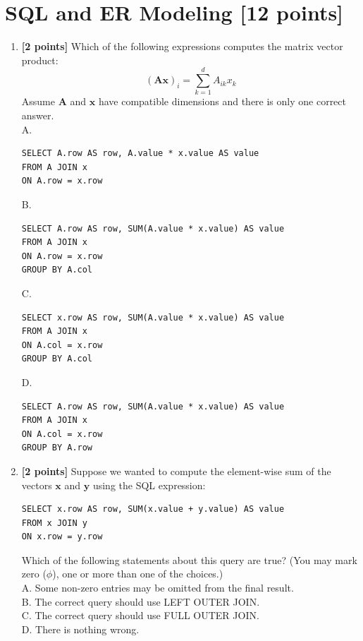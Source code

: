 \documentclass[10pt]{article}
\begin{document}
\newpage
\section{SQL and ER Modeling \textbf{[12 points]}}
\begin{enumerate}

	\item \textbf{[2 points]}
	      Which of the following expressions computes the matrix vector product:
	      $$
		      (\mathbf{A} \mathbf{x})_{i}=\sum_{k=1}^{d} A_{i k} x_{k}
	      $$
	      Assume $\mathbf{A}$ and $\mathbf{x}$ have compatible dimensions and there is only one correct answer.\\
	      A.
	      \begin{lstlisting}
SELECT A.row AS row, A.value * x.value AS value 
FROM A JOIN x
ON A.row = x.row
\end{lstlisting}
	      B.
	      \begin{lstlisting}
SELECT A.row AS row, SUM(A.value * x.value) AS value 
FROM A JOIN x
ON A.row = x.row
GROUP BY A.col
\end{lstlisting}
	      C.
	      \begin{lstlisting} 
SELECT x.row AS row, SUM(A.value * x.value) AS value 
FROM A JOIN x
ON A.col = x.row
GROUP BY A.col
\end{lstlisting}
	      D.
	      \begin{lstlisting} 
SELECT A.row AS row, SUM(A.value * x.value) AS value 
FROM A JOIN x
ON A.col = x.row
GROUP BY A.row
\end{lstlisting}

	\item \textbf{[2 points]}
	      Suppose we wanted to compute the element-wise sum of the vectors $\mathbf{x}$
	      and $\mathbf{y}$ using the SQL expression:
	      \begin{lstlisting}
SELECT x.row AS row, SUM(x.value + y.value) AS value 
FROM x JOIN y 
ON x.row = y.row
\end{lstlisting}
	      Which of the following statements about this query are true?
	      (You may mark zero ($\phi$), one or more than one of the choices.)\\
	      A. Some non-zero entries may be omitted from the final result.\\
	      B. The correct query should use LEFT OUTER JOIN.\\
	      C. The correct query should use FULL OUTER JOIN.\\
	      D. There is nothing wrong.


\end{enumerate}
\end{document}
